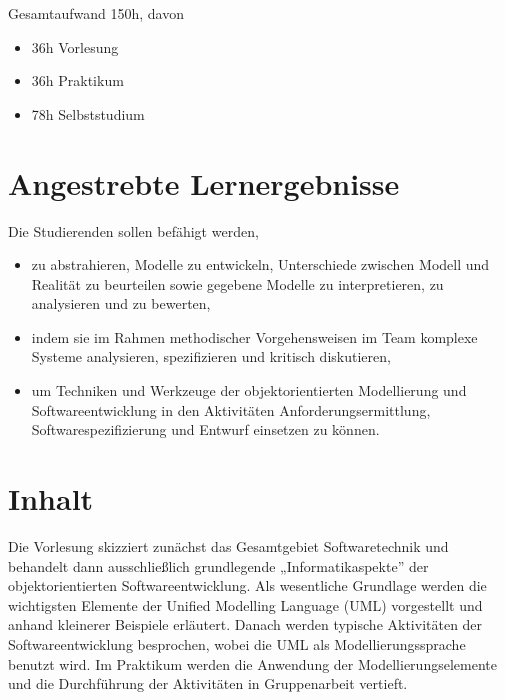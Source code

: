 Gesamtaufwand 150h, davon

\begin{itemize}
\tightlist
\item
  36h Vorlesung
\item
  36h Praktikum
\item
  78h Selbststudium
\end{itemize}

\hypertarget{angestrebte-lernergebnissepathlabel....srcmodulbeschreibungen-bachelor-bpo5ba_entwicklung-von-system-architekturen}{%
\section*{Angestrebte
Lernergebnisse\label{../../src/modulbeschreibungen-bachelor-bpo5/BA_Entwicklung-von-System-Architekturen}}\label{angestrebte-lernergebnissepathlabel....srcmodulbeschreibungen-bachelor-bpo5ba_entwicklung-von-system-architekturen}}

Die Studierenden sollen befähigt werden,

\begin{itemize}
\tightlist
\item
  zu abstrahieren, Modelle zu entwickeln, Unterschiede zwischen Modell
  und Realität zu beurteilen sowie gegebene Modelle zu interpretieren,
  zu analysieren und zu bewerten,
\item
  indem sie im Rahmen methodischer Vorgehensweisen im Team komplexe
  Systeme analysieren, spezifizieren und kritisch diskutieren,
\item
  um Techniken und Werkzeuge der objektorientierten Modellierung und
  Softwareentwicklung in den Aktivitäten Anforderungsermittlung,
  Softwarespezifizierung und Entwurf einsetzen zu können.
\end{itemize}

\hypertarget{inhaltpathlabel....srcmodulbeschreibungen-bachelor-bpo5ba_entwicklung-von-system-architekturen}{%
\section*{Inhalt\label{../../src/modulbeschreibungen-bachelor-bpo5/BA_Entwicklung-von-System-Architekturen}}\label{inhaltpathlabel....srcmodulbeschreibungen-bachelor-bpo5ba_entwicklung-von-system-architekturen}}

Die Vorlesung skizziert zunächst das Gesamtgebiet Softwaretechnik und
behandelt dann ausschließlich grundlegende „Informatikaspekte'' der
objektorientierten Softwareentwicklung. Als wesentliche Grundlage werden
die wichtigsten Elemente der Unified Modelling Language (UML)
vorgestellt und anhand kleinerer Beispiele erläutert. Danach werden
typische Aktivitäten der Softwareentwicklung besprochen, wobei die UML
als Modellierungssprache benutzt wird. Im Praktikum werden die Anwendung
der Modellierungselemente und die Durchführung der Aktivitäten in
Gruppenarbeit vertieft.

